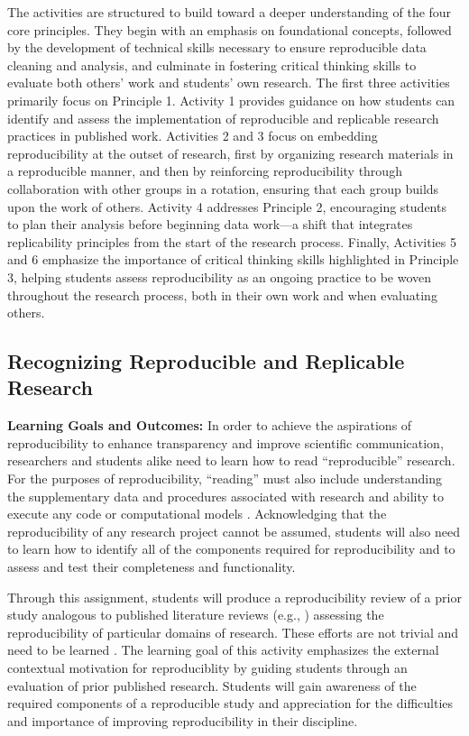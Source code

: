 \documentclass[
  12pt]{article}
\begin{document}
The activities are structured to build toward a deeper understanding of the four core principles. 
They begin with an emphasis on foundational concepts, followed by the development of technical skills necessary to ensure reproducible data cleaning and analysis, and culminate in fostering critical thinking skills to evaluate both others' work and students' own research.
The first three activities primarily focus on Principle 1.
Activity 1 provides guidance on how students can identify and assess the implementation of reproducible and replicable research practices in published work.
Activities 2 and 3 focus on embedding reproducibility at the outset of research, first by organizing research materials in a reproducible manner, and then by reinforcing reproducibility through collaboration with other groups in a rotation, ensuring that each group builds upon the work of others.
Activity 4 addresses Principle 2, encouraging students to plan their analysis before beginning data work—a shift that integrates replicability principles from the start of the research process.
Finally, Activities 5 and 6 emphasize the importance of critical thinking skills highlighted in Principle 3, helping students assess reproducibility as an ongoing practice to be woven throughout the research process, both in their own work and when evaluating others.

\subsection{Recognizing Reproducible and Replicable Research} \label{sec-recognize}

\textbf{Learning Goals and Outcomes:} 
In order to achieve the aspirations of reproducibility to enhance transparency and improve scientific communication, researchers and students alike need to learn how to read ``reproducible'' research.
For the purposes of reproducibility, ``reading'' must also include understanding the supplementary data and procedures associated with research and ability to execute any code or computational models \citep{nasem2019}.
Acknowledging that the reproducibility of any research project cannot be assumed, students will also need to learn how to identify all of the components required for reproducibility and to assess and test their completeness and functionality.

Through this assignment, students will produce a reproducibility review of a prior study analogous to published literature reviews (e.g., \cite{Hardwicke2020,Collins2022}) assessing the reproducibility of particular domains of research.
These efforts are not trivial and need to be learned \citep{vilh:2022}.
The learning goal of this activity emphasizes the external contextual motivation for reproduciblity by guiding students through an evaluation of prior published research.
Students will gain awareness of the required components of a reproducible study and appreciation for the difficulties and importance of improving reproducibility in their discipline.
\end{document}
